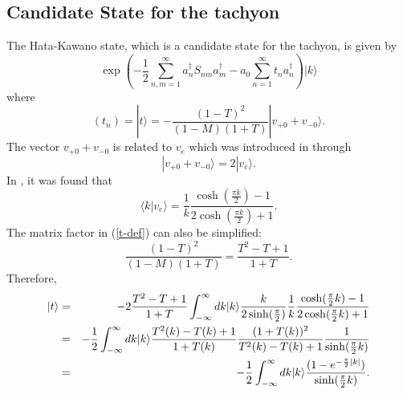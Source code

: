 \documentclass[a4paper,12pt]{article}
\begin{document}

\subsection{Candidate State for the tachyon}

The Hata-Kawano state, which is a candidate state for the tachyon, 
is given by \cite{Hata-Kawano}
\begin{equation}
\exp\left(-\frac{1}{2}\sum_{n,m=1}^{\infty}
a^{\dagger}_n S_{nm} a^{\dagger}_m
-a_0 \sum_{n=1}^{\infty} t_n a^{\dagger}_n\right)|k\rangle
\end{equation}
where
\begin{equation}\label{t-def}
(t_n)= |t\rangle
=-\frac{(1-T)^2}{(1-M)(1+T)}|v_{+0}+v_{-0}\rangle.
\end{equation}
The vector $v_{+0}+v_{-0}$ is related to $v_e$ which was
introduced in \cite{Okuyama-tension} through
\begin{equation}
|v_{+0}+v_{-0}\rangle=2|v_{e}\rangle.
\end{equation}
In \cite{Okuyama-tension}, it was found that
\begin{equation}\label{kve}
    \langle k|v_e\rangle=\frac{1}{k}\frac{\cosh\left(\frac{\pi
    k}{2}\right)-1}{2\cosh\left(\frac{\pi
    k}{2}\right)+1}.
\end{equation}
 The matrix factor in (\ref{t-def}) can also
be simplified:
\begin{equation}
\frac{(1-T)^2}{(1-M)(1+T)}=\frac{T^2-T+1}{1+T}.
\end{equation}
Therefore,
\begin{eqnarray}
|t\rangle&=&
-2\frac{T^2-T+1}{1+T}\int_{-\infty}^{\infty}
dk|k\rangle\frac{k}{2\sinh(\frac{\pi}{2})} \frac{1}{k}
\frac{\cosh(\frac{\pi}{2}k)-1}{2\cosh(\frac{\pi}{2}k)+1}\\
&=&
-\frac{1}{2}\int_{-\infty}^{\infty}dk|k\rangle
\frac{T^2(k)-T(k)+1}{1+T(k)}
{(1+T(k))^2\over T^2(k)-T(k)+1}{1\over \sinh({\pi\over 2}k)}\\
&=&
-{1\over 2}\int_{-\infty}^{\infty}dk|k\rangle{(1-e^{-{\pi\over 2}|k|})\over \sinh({\pi\over2}k)}.
\end{eqnarray}
\end{document}
